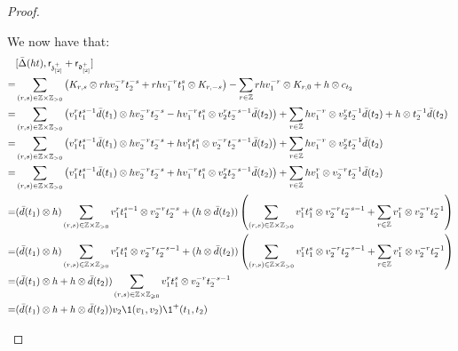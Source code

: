 \begin{proof}
\begin{enumerate}
                    We now have that:
                        $$
                            \begin{aligned}
                                & [\bar{\Delta}(ht), \sfr_{\z_{[2]}^{\positive}} + \sfr_{\d_{[2]}^{\positive}}]
                                \\
                                = & \sum_{(r, s) \in \Z \x \Z_{> 0}} \left( K_{r, s} \tensor r h v_2^{-r} t_2^{-s} + r h v_1^{-r} t_1^s \tensor K_{r, -s} \right) - \sum_{r \in \Z} r h v_1^{-r} \tensor K_{r, 0} + h \tensor c_{t_2}
                                \\
                                = & \sum_{(r, s) \in \Z \x \Z_{> 0}} \left( v_1^r t_1^{s - 1} \bar{d}(t_1) \tensor h v_2^{-r} t_2^{-s} - h v_1^{-r} t_1^s \tensor v_2^r t_2^{-s - 1} \bar{d}(t_2) \right) + \sum_{r \in \Z} h v_1^{-r} \tensor v_2^r t_2^{-1} \bar{d}(t_2) + h \tensor t_2^{-1} \bar{d}(t_2)
                                \\
                                = & \sum_{(r, s) \in \Z \x \Z_{> 0}} \left( v_1^r t_1^{s - 1} \bar{d}(t_1) \tensor h v_2^{-r} t_2^{-s} + h v_1^r t_1^s \tensor v_2^{-r} t_2^{-s - 1} \bar{d}(t_2) \right) + \sum_{r \in \Z} h v_1^{-r} \tensor v_2^r t_2^{-1} \bar{d}(t_2)
                                \\
                                = & \sum_{(r, s) \in \Z \x \Z_{> 0}} \left( v_1^r t_1^{s - 1} \bar{d}(t_1) \tensor h v_2^{-r} t_2^{-s} + h v_1^{-r} t_1^s \tensor v_2^r t_2^{-s - 1} \bar{d}(t_2) \right) + \sum_{r \in \Z} h v_1^r \tensor v_2^{-r} t_2^{-1} \bar{d}(t_2)
                                \\
                                = & ( \bar{d}(t_1) \tensor h ) \sum_{(r, s) \in \Z \x \Z_{> 0}} v_1^r t_1^{s - 1} \tensor v_2^{-r} t_2^{-s} + ( h \tensor \bar{d}(t_2) ) \left( \sum_{(r, s) \in \Z \x \Z_{> 0}} v_1^r t_1^s \tensor v_2^{-r} t_2^{-s - 1} + \sum_{r \in \Z} v_1^r \tensor v_2^{-r} t_2^{-1} \right)
                                \\
                                = & ( \bar{d}(t_1) \tensor h ) \sum_{(r, s) \in \Z \x \Z_{\geq 0}} v_1^r t_1^s \tensor v_2^{-r} t_2^{-s - 1} + ( h \tensor \bar{d}(t_2) ) \left( \sum_{(r, s) \in \Z \x \Z_{> 0}} v_1^r t_1^s \tensor v_2^{-r} t_2^{-s - 1} + \sum_{r \in \Z} v_1^r \tensor v_2^{-r} t_2^{-1} \right)
                                \\
                                = & ( \bar{d}(t_1) \tensor h + h \tensor \bar{d}(t_2) ) \sum_{(r, s) \in \Z \x \Z_{\geq 0}} v_1^r t_1^s \tensor v_2^{-r} t_2^{-s - 1}
                                \\
                                = & ( \bar{d}(t_1) \tensor h + h \tensor \bar{d}(t_2) ) v_2 \1(v_1, v_2) \1^+(t_1, t_2)
                            \end{aligned}
                        $$


\end{enumerate}
\end{proof}
